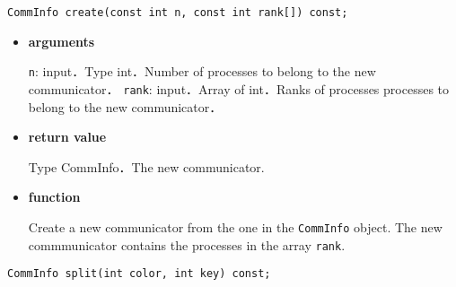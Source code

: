 \begin{screen}
\begin{verbatim}
CommInfo create(const int n, const int rank[]) const;
\end{verbatim}
\end{screen}

\begin{itemize}

\item {\bf arguments}

{\tt n}: input．Type int．Number of processes to belong to the new communicator．
{\tt rank}: input．Array of int．Ranks of processes processes to belong to the new communicator．

\item {\bf return value}

Type CommInfo．The new communicator.

\item {\bf function}

Create a new communicator from the one in the {\tt CommInfo} object.
The new commmunicator contains the processes in the array {\tt rank}.








\end{itemize}

\begin{screen}
\begin{verbatim}
CommInfo split(int color, int key) const;
\end{verbatim}
\end{screen}

